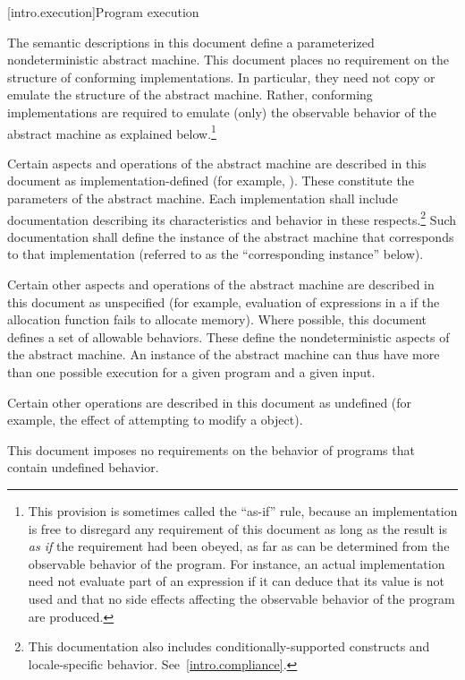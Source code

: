 [intro.execution]{Program execution}

\pnum
{}%
%
The semantic descriptions in this document define a
parameterized nondeterministic abstract machine. This document
places no requirement on the structure of conforming
implementations. In particular, they need not copy or emulate the
structure of the abstract machine.
%
%
Rather, conforming implementations are required to emulate (only) the observable
behavior of the abstract machine as explained below.\footnote{This provision is
sometimes called the ``as-if'' rule, because an implementation is free to
disregard any requirement of this document as long as the result
is \emph{as if} the requirement had been obeyed, as far as can be determined
from the observable behavior of the program. For instance, an actual
implementation need not evaluate part of an expression if it can deduce that its
value is not used and that no
%
side effects affecting the
observable behavior of the program are produced.}

%
\pnum
Certain aspects and operations of the abstract machine are described in this
document as implementation-defined (for example,
). These constitute the parameters of the abstract machine.
Each implementation shall include documentation describing its characteristics
and behavior in these respects.\footnote{This documentation also includes
conditionally-supported constructs and locale-specific behavior.
See~\ref{intro.compliance}.} Such documentation shall define the instance of the
abstract machine that corresponds to that implementation (referred to as the
``corresponding instance'' below).

%
\pnum
Certain other aspects and operations of the abstract machine are
described in this document as unspecified (for example,
evaluation of expressions in a  if the allocation
function fails to allocate memory). Where possible, this
document defines a set of allowable behaviors. These
define the nondeterministic aspects of the abstract machine. An instance
of the abstract machine can thus have more than one possible execution
for a given program and a given input.

%
\pnum
Certain other operations are described in this document as
undefined (for example, the effect of
attempting to modify a  object).
\begin{note} This document imposes no requirements on the
behavior of programs that contain undefined behavior. \end{note}

